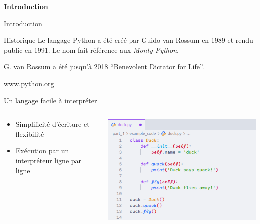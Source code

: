 \begin{frame}{}
    \centering
    \Large
    \textbf{Introduction}
\end{frame}

\begin{frame}{Introduction}
  \begin{block}{Historique}
    \medskip
    Le langage Python a été créé par Guido van Rossum en 1989 et rendu public en 1991. Le nom fait référence aux {\it Monty Python}.

    G. van Rossum a été jusqu'à 2018 ``Benevolent Dictator for Life''.
  \end{block}

  \bigskip
  \centering
  \url{www.python.org}
\end{frame}

\begin{frame}{Un langage facile à interpréter}

  \begin{columns}[T]
    \begin{column}{.5\textwidth}
      \begin{block}{}
        \begin{itemize}
          \item<+-> Simplificité d'écriture et flexibilité
          \item<+-> Exécution par un interpréteur ligne par ligne
        \end{itemize}
      \end{block}
    \end{column}%
    \hfill
    \begin{column}{.5\textwidth}
      \includegraphics[width=1.0\textwidth]{img/duck_code}
    \end{column}%
  \end{columns}

\end{frame}

